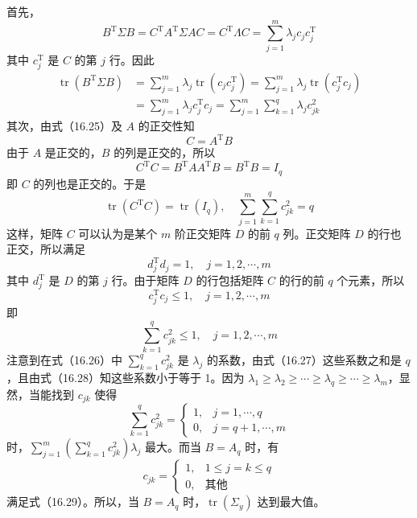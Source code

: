\documentclass[UTF8,12pt,a4paper,fontset=fandol]{ctexart}
\begin{document}
首先，
\[
B^{\mathrm{T}}\Sigma B=C^{\mathrm{T}}A^{\mathrm{T}}\Sigma AC=C^{\mathrm{T}}\Lambda C=\sum_{j=1}^m\lambda_jc_jc_j^{\mathrm{T}}
\]
其中 $c_j^{\mathrm{T}}$ 是 $C$ 的第 $j$ 行。因此
\begin{equation}
\begin{aligned}
\operatorname{tr}(B^{\mathrm{T}}\Sigma B)
&=\sum_{j=1}^m\lambda_j\operatorname{tr}(c_jc_j^{\mathrm{T}})
=\sum_{j=1}^m\lambda_j\operatorname{tr}(c_j^{\mathrm{T}}c_j)\\
&=\sum_{j=1}^m\lambda_jc_j^{\mathrm{T}}c_j
=\sum_{j=1}^m\sum_{k=1}^q\lambda_jc_{jk}^2
\end{aligned}
\tag{16.26}
\end{equation}
其次，由式（16.25）及 $A$ 的正交性知
\[
C=A^{\mathrm{T}}B
\]
由于 $A$ 是正交的，$B$ 的列是正交的，所以
\[
C^{\mathrm{T}}C=B^{\mathrm{T}}AA^{\mathrm{T}}B=B^{\mathrm{T}}B=I_q
\]
即 $C$ 的列也是正交的。于是
\begin{equation}
\operatorname{tr}(C^{\mathrm{T}}C)=\operatorname{tr}(I_q),\quad
\sum_{j=1}^m\sum_{k=1}^q c_{jk}^2=q
\tag{16.27}
\end{equation}
这样，矩阵 $C$ 可以认为是某个 $m$ 阶正交矩阵 $D$ 的前 $q$ 列。正交矩阵 $D$ 的行也正交，所以满足
\[
d_j^{\mathrm{T}}d_j=1,\quad j=1,2,\cdots,m
\]
其中 $d_j^{\mathrm{T}}$ 是 $D$ 的第 $j$ 行。由于矩阵 $D$ 的行包括矩阵 $C$ 的行的前 $q$ 个元素，所以
\[
c_j^{\mathrm{T}}c_j\leqslant 1,\quad j=1,2,\cdots,m
\]
即
\begin{equation}
\sum_{k=1}^q c_{jk}^2\leqslant 1,\quad j=1,2,\cdots,m
\tag{16.28}
\end{equation}
注意到在式（16.26）中 $\sum_{k=1}^q c_{jk}^2$ 是 $\lambda_j$ 的系数，由式（16.27）这些系数之和是 $q$，且由式（16.28）知这些系数小于等于 1。因为 $\lambda_1\geqslant\lambda_2\geqslant\cdots\geqslant\lambda_q\geqslant\cdots\geqslant\lambda_m$，显然，当能找到 $c_{jk}$ 使得
\begin{equation}
\sum_{k=1}^q c_{jk}^2=
\begin{cases}
1, & j=1,\cdots,q\\
0, & j=q+1,\cdots,m
\end{cases}
\tag{16.29}
\end{equation}
时，$\sum_{j=1}^m\left(\sum_{k=1}^q c_{jk}^2\right)\lambda_j$ 最大。而当 $B=A_q$ 时，有
\[
c_{jk}=
\begin{cases}
1, & 1\leqslant j=k\leqslant q\\
0, & \text{其他}
\end{cases}
\]
满足式（16.29）。所以，当 $B=A_q$ 时，$\operatorname{tr}(\Sigma_y)$ 达到最大值。
\end{document}
